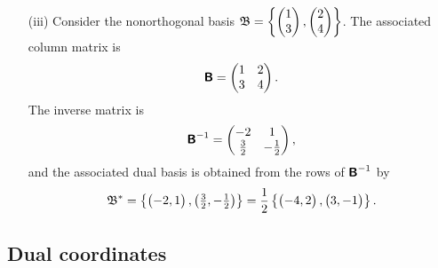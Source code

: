 {\begin{itemize}
\item[(iii)]
Consider the nonorthogonal basis
${\frak B} =
\left\{\begin{pmatrix}1\\3\end{pmatrix}, \begin{pmatrix}2\\ 4\end{pmatrix}\right\}$.
The associated column matrix is
\begin{equation}
\textsf{\textbf{B}}
=
\begin{pmatrix}
1&2\\
3&4
\end{pmatrix}
.
\end{equation}
The inverse matrix is
\begin{equation}
\textsf{\textbf{B}}^{-1}
=
\begin{pmatrix}
-2&1\\
\frac{3}{2}&-\frac{1}{2}
\end{pmatrix}
,
\end{equation}
and the associated dual basis is obtained from the rows of $\textsf{\textbf{B}}^{-1} $ by
\begin{equation}
{\frak B}^* =
\left\{
\begin{pmatrix}
-2, 1
\end{pmatrix},
\begin{pmatrix}
\frac{3}{2},
-\frac{1}{2}
\end{pmatrix}
\right\} = \frac{1}{2}
\left\{
\begin{pmatrix}
-4,
2
\end{pmatrix},
\begin{pmatrix}
3,
-1
\end{pmatrix}
\right\}
.
\label{2011-m-cenobdb}
\end{equation}
\eexample
\end{itemize}
}


\subsection{Dual coordinates}

